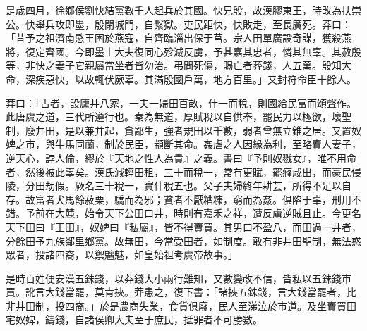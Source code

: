 \begin{pinyinscope}
是歲四月，徐鄉侯劉快結黨數千人起兵於其國。快兄殷，故漢膠東王，時改為扶崇公。快舉兵攻即墨，殷閉城門，自繫獄。吏民距快，快敗走，至長廣死。莽曰：「昔予之祖濟南愍王困於燕寇，自齊臨淄出保于莒。宗人田單廣設奇謀，獲殺燕將，復定齊國。今即墨士大夫復同心殄滅反虜，予甚嘉其忠者，憐其無辜。其赦殷等，非快之妻子它親屬當坐者皆勿治。弔問死傷，賜亡者葬錢，人五萬。殷知大命，深疾惡快，以故輒伏厥辜。其滿殷國戶萬，地方百里。」又封符命臣十餘人。

莽曰：「古者，設廬井八家，一夫一婦田百畝，什一而稅，則國給民富而頌聲作。此唐虞之道，三代所遵行也。秦為無道，厚賦稅以自供奉，罷民力以極欲，壞聖制，廢井田，是以兼并起，貪鄙生，強者規田以千數，弱者曾無立錐之居。又置奴婢之市，與牛馬同蘭，制於民臣，顓斷其命。姦虐之人因緣為利，至略賣人妻子，逆天心，誖人倫，繆於『天地之性人為貴』之義。書曰『予則奴戮女』，唯不用命者，然後被此辜矣。漢氏減輕田租，三十而稅一，常有更賦，罷癃咸出，而豪民侵陵，分田劫假。厥名三十稅一，實什稅五也。父子夫婦終年耕芸，所得不足以自存。故富者犬馬餘菽粟，驕而為邪；貧者不厭糟糠，窮而為姦。俱陷于辜，刑用不錯。予前在大麓，始令天下公田口井，時則有嘉禾之祥，遭反虜逆賊且止。今更名天下田曰『王田』，奴婢曰『私屬』，皆不得賣買。其男口不盈八，而田過一井者，分餘田予九族鄰里鄉黨。故無田，今當受田者，如制度。敢有非井田聖制，無法惑眾者，投諸四裔，以禦魑魅，如皇始祖考虞帝故事。」

是時百姓便安漢五銖錢，以莽錢大小兩行難知，又數變改不信，皆私以五銖錢市買。訛言大錢當罷，莫肯挾。莽患之，復下書：「諸挾五銖錢，言大錢當罷者，比非井田制，投四裔。」於是農商失業，食貨俱廢，民人至涕泣於市道。及坐賣買田宅奴婢，鑄錢，自諸侯卿大夫至于庶民，抵罪者不可勝數。


\end{pinyinscope}
